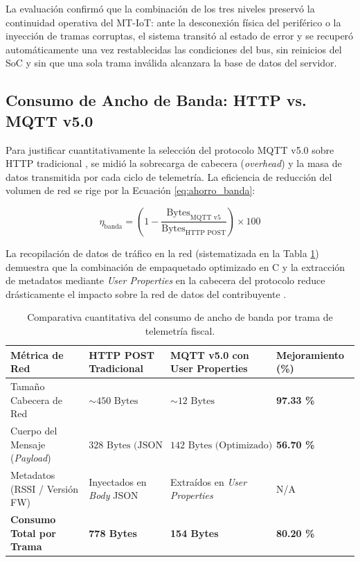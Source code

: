 \par La evaluación confirmó que la combinación de los tres niveles preservó la continuidad operativa del MT-IoT: ante la desconexión física del periférico o la inyección de tramas corruptas, el sistema transitó al estado de error y se recuperó automáticamente una vez restablecidas las condiciones del bus, sin reinicios del SoC y sin que una sola trama inválida alcanzara la base de datos del servidor.

\subsection{Consumo de Ancho de Banda: HTTP vs. MQTT v5.0}

\par Para justificar cuantitativamente la selección del protocolo MQTT v5.0 sobre HTTP tradicional \cite{OASIS_MQTT_v5}, se midió la sobrecarga de cabecera (\textit{overhead}) y la masa de datos transmitida por cada ciclo de telemetría. La eficiencia de reducción del volumen de red se rige por la Ecuación \ref{eq:ahorro_banda}:

\begin{equation}
\eta_{\text{banda}} = \left( 1 - \frac{\text{Bytes}_{\text{MQTT v5}}}{\text{Bytes}_{\text{HTTP POST}}} \right) \times 100
\label{eq:ahorro_banda}
\end{equation}

\par La recopilación de datos de tráfico en la red (sistematizada en la Tabla \ref{tab:ancho_banda}) demuestra que la combinación de empaquetado optimizado en C y la extracción de metadatos mediante \textit{User Properties} en la cabecera del protocolo reduce drásticamente el impacto sobre la red de datos del contribuyente \cite{OASIS_MQTT_v5}.

\begin{table}[htbp]
\centering
\caption{Comparativa cuantitativa del consumo de ancho de banda por trama de telemetría fiscal.}
\label{tab:ancho_banda}
\small
\begin{tabularx}{\textwidth}{@{}>{\raggedright\arraybackslash}X >{\raggedright\arraybackslash}X >{\raggedright\arraybackslash}X >{\raggedright\arraybackslash}p{2.6cm}@{}}
\toprule
\textbf{Métrica de Red} & \textbf{HTTP POST Tradicional} & \textbf{MQTT v5.0 con User Properties} & \textbf{Mejoramiento (\%)} \\
\midrule
Tamaño Cabecera de Red & $\sim 450 \text{ Bytes}$ & $\sim 12 \text{ Bytes}$ & \textbf{97.33 \%} \\
Cuerpo del Mensaje (\textit{Payload}) & $328 \text{ Bytes (JSON Plano)}$ & $142 \text{ Bytes (Optimizado)}$ & \textbf{56.70 \%} \\
Metadatos (RSSI / Versión FW) & Inyectados en \textit{Body} JSON & Extraídos en \textit{User Properties} & N/A \\
\midrule
\textbf{Consumo Total por Trama} & \textbf{778 Bytes} & \textbf{154 Bytes} & \textbf{80.20 \%} \\
\bottomrule
\end{tabularx}
\end{table}

